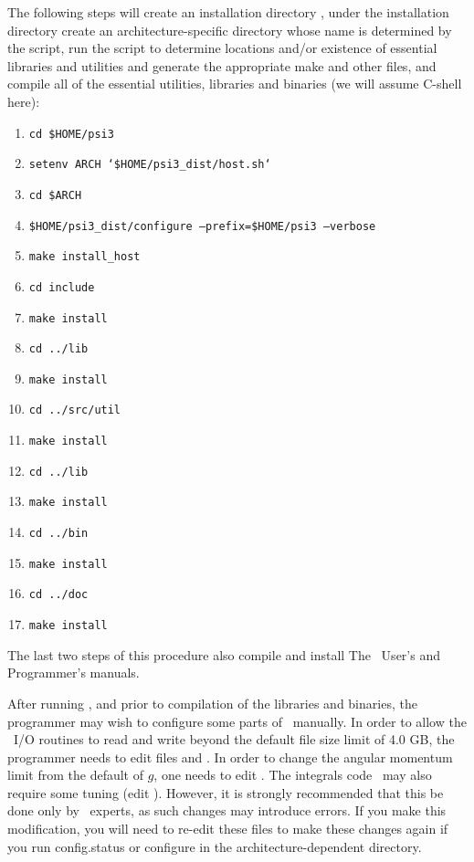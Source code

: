 The following steps will create an installation directory
, under the installation directory
create an architecture-specific directory
whose name is determined by the  script,
run the  script to determine locations and/or existence of
essential libraries and utilities and generate the appropriate make and other files,
and compile all of the essential utilities, libraries and binaries
(we will assume C-shell here):
\begin{enumerate}
\item {\tt cd \$HOME/psi3}
\item {\tt setenv ARCH `\$HOME/psi3\_dist/host.sh`}
\item {\tt cd \$ARCH}
\item {\tt \$HOME/psi3\_dist/configure --prefix=\$HOME/psi3 --verbose}
\item {\tt make install\_host}
\item {\tt cd include}
\item {\tt make install}
\item {\tt cd ../lib}
\item {\tt make install}
\item {\tt cd ../src/util}
\item {\tt make install}
\item {\tt cd ../lib}
\item {\tt make install}
\item {\tt cd ../bin}
\item {\tt make install}
\item {\tt cd ../doc}
\item {\tt make install}
\end{enumerate}
The last two steps of this procedure also compile and install
The \PSIthree\ User's and Programmer's manuals.

After running , and prior to compilation of the libraries and binaries, the
programmer may wish to configure some parts of \PSIthree\ manually. In order
to allow the \PSIthree\ I/O routines to read and write beyond the default
file size limit of 4.0 GB, the programmer needs to edit files
 and
.
In order to change the angular momentum limit from the default of $g$,
one needs to edit .
The integrals code \PSIcints\ may also require some tuning (edit
).
However, it is strongly recommended that this be done only by \PSIthree\ experts, as such changes
may introduce errors. If you make this modification, you will need to re-edit
these files to make these changes again if you run config.status or configure
in the architecture-dependent directory.

